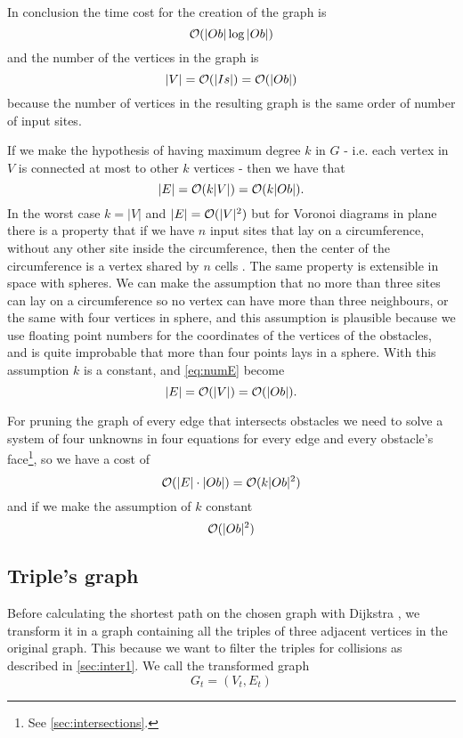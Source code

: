 \documentclass[dissertation.tex]{subfiles}
\begin{document}
In conclusion the time cost for the creation of the graph
is
\newcommand{\eqCostGraph}{\ensuremath{\bigO(|Ob|\log |Ob|)}}
\begin{equation}
  \label{eq:costGraph}
  \eqCostGraph
\end{equation}
and the number of the vertices in the graph
is 
\begin{equation}
  \label{eq:numV}
  |V|=\mathcal{O}(|Is|)=\mathcal{O}(|Ob|)
\end{equation}
because the number of vertices in the resulting graph is the
same order of number of input sites.

If we make the hypothesis of having maximum degree $k$ in $G$ -
i.e. each vertex in $V$ is connected at most to other $k$ vertices -
then we have that
\begin{equation}
  \label{eq:numE}
  |E|=\mathcal{O}(k|V|)=\mathcal{O}(k|Ob|).
\end{equation}
In the worst case $k=|V|$ and $|E|=\mathcal{O}(|V|^2)$ but for Voronoi
diagrams in plane there is a property that if we have $n$ input sites
that lay on a circumference, without any other site inside the
circumference, then the center of the circumference is a vertex shared
by $n$ cells \cite{deberg}. The same property is extensible in space with
spheres. We can make the assumption that no more than three sites can lay
on a circumference so no vertex can have more than three neighbours,
or the same with four vertices in sphere, and this assumption is
plausible because we use floating point numbers for the coordinates of
the vertices of the obstacles, and is quite improbable that more than
four points lays in a sphere. With this assumption $k$ is a constant,
and \cref{eq:numE} become
\begin{equation*}
  |E|=\mathcal{O}(|V|)=\mathcal{O}(|Ob|).
\end{equation*}

For pruning the graph of every edge that intersects obstacles we need
to solve a system of four unknowns in four equations for every edge
and every obstacle's face\footnote{See \cref{sec:intersections}.}, so
we have a cost of
\newcommand{\eqCostPruning}{\ensuremath{\bigO(k|Ob|^2)}}
\begin{equation}
  \label{eq:costPruning}
  \bigO(|E|\cdot|Ob|)=\eqCostPruning
\end{equation}
and if we make the assumption of $k$ constant
\begin{equation*}
  \mathcal{O}(|Ob|^2)
\end{equation*}

\subsection{Triple's graph}\label{sec:trigraph}
Before calculating the shortest path on the chosen graph with Dijkstra
\cite{dijkstra}\cite{knuth}, we
transform it in a graph containing all the triples
of three adjacent vertices in the original graph. This because we want
to filter the triples for collisions as described in
\cref{sec:inter1}. We call the transformed graph
$$G_t=(V_t,E_t)$$
\end{document}
